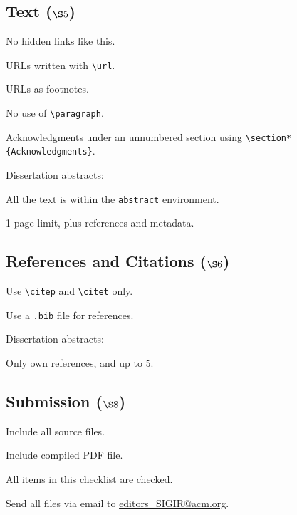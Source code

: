 \documentclass[news]{sigirforum}
\begin{document}
\subsection*{Text ($\S5$)}

\begin{checklist}
\item No \href{https://#}{hidden links like this}.
\item URLs written with \texttt{\textbackslash url}.
\item URLs as footnotes.
\item No use of \texttt{\textbackslash paragraph}.
\item Acknowledgments under an unnumbered section using \texttt{\textbackslash section*\{Acknowledgments\}}.
\item Dissertation abstracts:
	\begin{checklist}
	\item All the text is within the \texttt{abstract} environment.
	\item 1-page limit, plus references and metadata.
	\end{checklist}
\end{checklist}

\subsection*{References and Citations ($\S6$)}

\begin{checklist}
\item Use \texttt{\textbackslash citep} and \texttt{\textbackslash citet} only.
\item Use a \texttt{.bib} file for references.
\item Dissertation abstracts:
	\begin{checklist}
	\item Only own references, and up to 5.
	\end{checklist}
\end{checklist}

\subsection*{Submission ($\S8$)}

\begin{checklist}
\item Include all source files.
\item Include compiled PDF file.
\item All items in this checklist are checked.
\item Send all files via email to \url{editors\_SIGIR@acm.org}.
\end{checklist}
\end{document}
